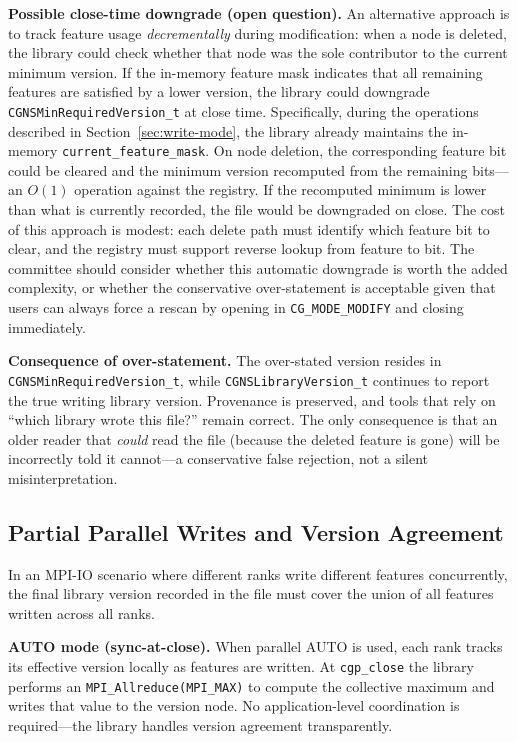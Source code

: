 \documentclass[11pt,letterpaper]{article}
\begin{document}
\textbf{Possible close-time downgrade (open question).}  An
alternative approach is to track feature usage \emph{decrementally}
during modification: when a node is deleted, the library could check
whether that node was the sole contributor to the current minimum
version.  If the in-memory feature mask indicates that all remaining
features are satisfied by a lower version, the library could
downgrade \texttt{CGNSMinRequiredVersion\_t} at close time.
Specifically, during the operations described in
Section~\ref{sec:write-mode}, the library already maintains the
in-memory \texttt{current\_feature\_mask}.  On node deletion, the
corresponding feature bit could be cleared and the minimum version
recomputed from the remaining bits---an $O(1)$ operation against the
registry.  If the recomputed minimum is lower than what is currently
recorded, the file would be downgraded on close.  The cost of this
approach is modest: each delete path must identify which feature bit
to clear, and the registry must support reverse lookup from feature
to bit.  The committee should consider whether this automatic
downgrade is worth the added complexity, or whether the conservative
over-statement is acceptable given that users can always force a
rescan by opening in \texttt{CG\_MODE\_MODIFY} and closing
immediately.

\textbf{Consequence of over-statement.}  The over-stated version
resides in \texttt{CGNSMinRequiredVersion\_t}, while
\texttt{CGNSLibraryVersion\_t} continues to report the true writing
library version.  Provenance is preserved, and tools that rely on
``which library wrote this file?'' remain correct.  The only
consequence is that an older reader that \emph{could} read the file
(because the deleted feature is gone) will be incorrectly told it
cannot---a conservative false rejection, not a silent
misinterpretation.

\subsection{Partial Parallel Writes and Version Agreement}

In an MPI-IO scenario where different ranks write different features
concurrently, the final library version recorded in the file must cover the union of all
features written across all ranks.

\textbf{AUTO mode (sync-at-close).}  When parallel AUTO is used,
each rank tracks its effective version locally as features are
written.  At \texttt{cgp\_close} the library performs an
\texttt{MPI\_Allreduce(MPI\_MAX)} to compute the collective maximum
and writes that value to the version node.  No application-level
coordination is required---the library handles version agreement
transparently.
\end{document}
